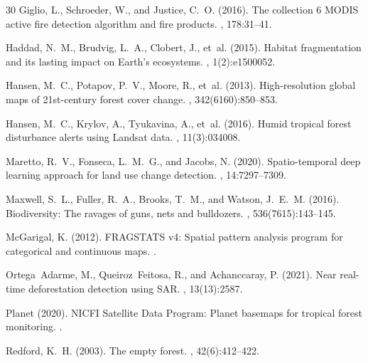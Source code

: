 \documentclass[11pt,a4paper]{article}
\begin{document}
\begin{thebibliography}{30}
Giglio, L., Schroeder, W., and Justice, C.~O. (2016).
\newblock The collection 6 MODIS active fire detection algorithm and fire products.
, 178:31--41.

Haddad, N.~M., Brudvig, L.~A., Clobert, J., et~al. (2015).
\newblock Habitat fragmentation and its lasting impact on Earth's ecosystems.
, 1(2):e1500052.

Hansen, M.~C., Potapov, P.~V., Moore, R., et~al. (2013).
\newblock High-resolution global maps of 21st-century forest cover change.
, 342(6160):850--853.

Hansen, M.~C., Krylov, A., Tyukavina, A., et~al. (2016).
\newblock Humid tropical forest disturbance alerts using Landsat data.
, 11(3):034008.

Maretto, R.~V., Fonseca, L.~M.~G., and Jacobs, N. (2020).
\newblock Spatio-temporal deep learning approach for land use change detection.
, 14:7297--7309.

Maxwell, S.~L., Fuller, R.~A., Brooks, T.~M., and Watson, J.~E.~M. (2016).
\newblock Biodiversity: The ravages of guns, nets and bulldozers.
, 536(7615):143--145.

McGarigal, K. (2012).
\newblock FRAGSTATS v4: Spatial pattern analysis program for categorical and continuous maps.
.

Ortega~Adarme, M., Queiroz~Feitosa, R., and Achanccaray, P. (2021).
\newblock Near real-time deforestation detection using SAR.
, 13(13):2587.

Planet (2020).
\newblock NICFI Satellite Data Program: Planet basemaps for tropical forest monitoring.
.

Redford, K.~H. (2003).
\newblock The empty forest.
, 42(6):412--422.


\end{thebibliography}
\end{document}
